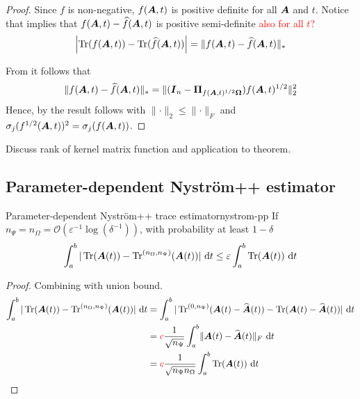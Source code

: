 \documentclass[12pt]{article}
\begin{document}
\begin{proof}
    Since $f$ is non-negative, $f(\boldsymbol{A}, t)$ is positive definite for all $\boldsymbol{A}$ and $t$.
    Notice that \cite[Lemma 2.1, item 3]{frangella-2023-randomized-nystrom} implies that $f(\boldsymbol{A}, t) - \widehat{f}(\boldsymbol{A}, t)$ is positive semi-definite \textcolor{red}{also for all $t$?}
    \begin{equation}
        \left| \operatorname{Tr}(f(\boldsymbol{A}, t)) - \operatorname{Tr}(\widehat{f}(\boldsymbol{A}, t)) \right|
        = \lVert f(\boldsymbol{A}, t) - \widehat{f}(\boldsymbol{A}, t) \rVert _{\ast}
    \end{equation}

    From \cite[Proof of Corollary 8.2]{tropp-2023-randomized-algorithms} it follows that
    \begin{equation}
        \lVert f(\boldsymbol{A}, t) - \widehat{f}(\boldsymbol{A}, t) \rVert _{\ast} = \lVert (\boldsymbol{I}_n - \boldsymbol{\Pi}_{f(\boldsymbol{A}, t)^{1/2} \boldsymbol{\Omega}}) f(\boldsymbol{A}, t)^{1/2} \rVert _2^2
    \end{equation}
    Hence, by \cite[Theorem 9]{kressner-2023-randomized-lowrank} the result follows
    with $\lVert \cdot \rVert _2 \leq \lVert \cdot \rVert _F$ and $\sigma_j(f^{1/2}(\boldsymbol{A}, t))^{2} = \sigma_j(f(\boldsymbol{A}, t))$.
\end{proof}

Discuss rank of kernel matrix function and application to theorem.

\subsection{Parameter-dependent Nystr\"om++ estimator}
\label{subsec:nystrom-pp}


\begin{theorem}{Parameter-dependent Nystr\"om++ trace estimator}{nystrom-pp}
    If $n_{\Psi} = n_{\Omega} = \mathcal{O}(\varepsilon^{-1} \log(\delta^{-1}))$, with probability at least $1 - \delta$
    \begin{equation}
        \int_{a}^{b} | \operatorname{Tr}(\boldsymbol{A}(t)) - \operatorname{Tr}^{(n_{\Omega}, n_{\Psi})}(\boldsymbol{A}(t)) |~\mathrm{d}t
        \leq \varepsilon \int_{a}^{b} \operatorname{Tr}(\boldsymbol{A}(t))~\mathrm{d}t
    \end{equation}
\end{theorem}

\begin{proof}
    Combining with union bound.
    \begin{align}
        \int_{a}^{b} | \operatorname{Tr}(\boldsymbol{A}(t)) - \operatorname{Tr}^{(n_{\Omega}, n_{\Psi})}(\boldsymbol{A}(t)) |~\mathrm{d}t
        &= \int_{a}^{b} | \operatorname{Tr}^{(0, n_{\Psi})}(\boldsymbol{A}(t) - \widehat{\boldsymbol{A}}(t)) - \operatorname{Tr}(\boldsymbol{A}(t) - \widehat{\boldsymbol{A}}(t)) |~\mathrm{d}t \notag \\
        &= {{\color{red}c}} \frac{1}{\sqrt{n_{\Psi}}} \int_{a}^{b} \lVert \boldsymbol{A}(t) - \widehat{\boldsymbol{A}}(t) \rVert _F ~\mathrm{d}t \notag \\
        &= {{\color{red}c}} \frac{1}{\sqrt{n_{\Psi} n_{\Omega}}} \int_{a}^{b} \operatorname{Tr}(\boldsymbol{A}(t)) ~\mathrm{d}t
    \end{align}
\end{proof}
\end{document}
